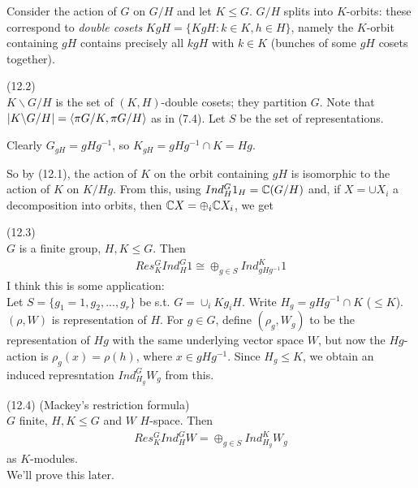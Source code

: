 \documentclass[a4paper]{article}
\begin{document}
Consider the action of $G$ on $G/H$ and let $K \leq G$. $G/H$ splits into $K$-orbits: these correspond to \emph{double cosets} $KgH = \{KgH : k \in K, h \in H\}$, namely the $K$-orbit containing $gH$ contains precisely all $kgH$ with $k \in K$ (bunches of some $gH$ cosets together).

\begin{notation} (12.2)\\
$K\backslash G/H$ is the set of $(K,H)$-double cosets; they partition $G$. Note that $|K\backslash G/H| = \langle \pi G/K,\pi G/H\rangle$ as in (7.4). Let $S$ be the set of representations.
\end{notation}

Clearly $G_{gH} = gHg^{-1}$, so $K_{gH} = gHg^{-1} \cap K = Hg$.

So by (12.1), the action of $K$ on the orbit containing $gH$ is isomorphic to the action of $K$ on $K/Hg$. From this, using $Ind_H^G 1_H = \mathbb{C}(G/H)$ and, if $X = \cup X_i$ a decomposition into orbits, then $\mathbb{C} X = \oplus_i \mathbb{C} X_i$, we get

\begin{prop} (12.3)\\
$G$ is a finite group, $H,K \leq G$. Then
\begin{equation*}
\begin{aligned}
Res_K^G Ind_H^G 1 \cong \oplus_{g \in S} Ind_{gHg^{-1}}^K 1
\end{aligned}
\end{equation*}
I think this is some application:\\
Let $S = \{g_1=1,g_2,...,g_r\}$ be s.t. $G = \cup_i Kg_i H$. Write $H_g = gHg^{-1} \cap K$ ($\leq K$). $(\rho,W)$ is representation of $H$. For $g \in G$, define $(\rho_g,W_g)$ to be the representation of $Hg$ with the same underlying vector space $W$, but now the $Hg$-action is $\rho_g(x) = \rho(h)$, where $x \in gHg^{-1}$. Since $H_g \leq K$, we obtain an induced represntation $Ind_{H_g}^G W_g$ from this.
\end{prop}

\begin{thm} (12.4) (Mackey's restriction formula)\\
$G$ finite, $H,K \leq G$ and $W$ $H$-space. Then
\begin{equation*}
\begin{aligned}
Res_K^G Ind_H^G W = \oplus_{g\in S} Ind_{H_g}^K W_g
\end{aligned}
\end{equation*}
as $K$-modules.\\
We'll prove this later.
\end{thm}
\end{document}
